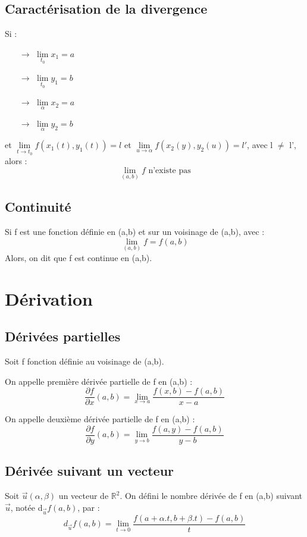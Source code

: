 \subsection{Caractérisation de la divergence}
Si : 
\begin{itemize}
 \item[$\rightarrow$] $\underset{t_0}\lim x_1 = a$ 
 \item[$\rightarrow$] $\underset{t_0}\lim y_1 = b$ 
 \item[$\rightarrow$] $\underset{\alpha}\lim x_2 = a$ 
 \item[$\rightarrow$] $\underset{\alpha}\lim y_2 = b$ 
\end{itemize}
et $\underset{t \rightarrow t_0}\lim f(x_1(t),y_1(t)) = l$ et $\underset{u \rightarrow \alpha}\lim f(x_2(y),y_2(u)) = l'$, avec  l $\neq$ l', alors : 
$$\underset{(a,b)}\lim f \mbox{ n'existe pas}$$
\subsection{Continuité}
\begin{de}
Si f est une fonction définie en (a,b) et sur un voisinage de (a,b), avec : 
$$\lim_{(a,b)} f = f(a,b)$$
Alors, on dit que f est continue en (a,b).
\end{de}
\section{Dérivation}
\subsection{Dérivées partielles}
Soit f fonction définie au voisinage de (a,b).
\begin{de}
On appelle première dérivée partielle de f en (a,b) : 
$$\dfrac{\partial f}{\partial x} (a,b) = \lim_{x \rightarrow a} \dfrac{f(x,b) - f(a,b)}{x-a}$$
\end{de}
\begin{de}
On appelle deuxième dérivée partielle de f en (a,b) : 
$$\dfrac{\partial f}{\partial y} (a,b) = \lim_{y \rightarrow b} \dfrac{f(a,y) - f(a,b)}{y-b}$$
\end{de}
\subsection{Dérivée suivant un vecteur}
\begin{de}
Soit $\overrightarrow{u}(\alpha,\beta)$ un vecteur de $\mathbb{R}^2$.
On défini le nombre dérivée de f en (a,b) suivant $\overrightarrow{u}$, notée d$_{\overrightarrow{u}}f(a,b)$, par : 
$$d_{\overrightarrow{u}}f(a,b) = \lim_{t \rightarrow 0} \dfrac{f(a+\alpha.t,b+\beta.t) - f(a,b)}{t}$$
\end{de}
